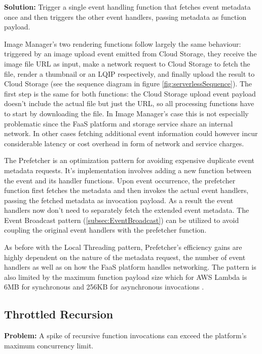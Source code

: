 
\textbf{Solution:} Trigger a single event handling function that fetches event metadata once and then triggers the other event handlers, passing metadata as function payload.

Image Manager's two rendering functions follow largely the same behaviour: triggered by an image upload event emitted from Cloud Storage, they receive the image file URL as input, make a network request to Cloud Storage to fetch the file, render a thumbnail or an LQIP respectively, and finally upload the result to Cloud Storage (see the sequence diagram in figure \ref{fig:serverlessSequence}). The first step is the same for both functions: the Cloud Storage upload event payload doesn't include the actual file but just the URL, so all processing functions have to start by downloading the file. In Image Manager's case this is not especially problematic since the FaaS platform and storage service share an internal network. In other cases fetching additional event information could however incur considerable latency or cost overhead in form of network and service charges.

The Prefetcher is an optimization pattern for avoiding expensive duplicate event metadata requests. It's implementation involves adding a new function between the event and its handler functions. Upon event occurrence, the prefetcher function first fetches the metadata and then invokes the actual event handlers, passing the fetched metadata as invocation payload. As a result the event handlers now don't need to separately fetch the extended event metadata. The Event Broadcast pattern (\ref{subsec:EventBroadcast}) can be utilized to avoid coupling the original event handlers with the prefetcher function.

As before with the Local Threading pattern, Prefetcher's efficiency gains are highly dependent on the nature of the metadata request, the number of event handlers as well as on how the FaaS platform handles networking. The pattern is also limited by the maximum function payload size which for AWS Lambda is 6MB for synchronous and 256KB for asynchronous invocations \parencite{awslambda0218}.

\subsection{Throttled Recursion} \label{subsec:throttledRecursion}

\textbf{Problem:} A spike of recursive function invocations can exceed the platform's maximum concurrency limit.

